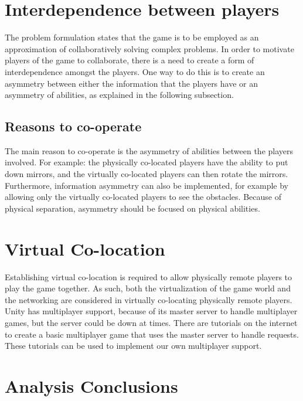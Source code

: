 	\section{Interdependence between players} \label{sec:interdependence}
		The problem formulation states that the game is to be employed as an
		approximation of collaboratively solving complex problems. In order to
		motivate players of the game to collaborate, there is a need to create
		a form of interdependence amongst the players. One way to do this is to
		create an asymmetry between either the information that the players have or
		an asymmetry of abilities, as explained in the following subsection.
		\subsection{Reasons to co-operate}
			The main reason to co-operate is the asymmetry of abilities between
			the players involved. For example: the physically co-located players
			have the ability to put down mirrors, and the virtually co-located
			players can then rotate the mirrors. Furthermore, information
			asymmetry can also be implemented, for example by allowing only the
			virtually co-located players to see the obstacles. Because of physical
			separation, asymmetry should be focused on physical abilities.

	\section{Virtual Co-location} \label{sec:virtualcolocation}
		Establishing virtual co-location is required to allow physically remote players
		to play the game together. As such, both the virtualization of the game world and
		the networking are considered in virtually co-locating physically remote players.
		Unity has multiplayer support, because of its master server to handle multiplayer
		games, but the server could be down at times. There are tutorials on the internet
		to create a basic multiplayer game that uses the master server to handle requests.
		These tutorials can be used to implement our own multiplayer support.

	\section{Analysis Conclusions} \label{sec:analysisconclusion}
